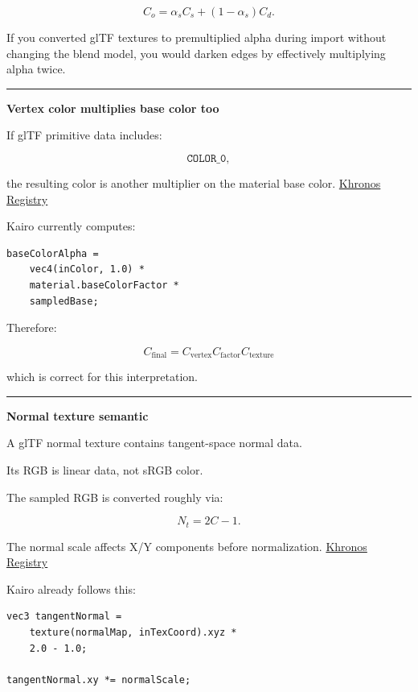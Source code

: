 \[
C_o
=
\alpha_sC_s+
(1-\alpha_s)C_d.
\]

If you converted glTF textures to premultiplied alpha during import without changing the blend model, you would darken edges by effectively multiplying alpha twice.

\begin{center}\rule{0.5\linewidth}{0.5pt}\end{center}

\textbf{Vertex color multiplies base color too}

If glTF primitive data includes:

\[
\texttt{COLOR_0},
\]

the resulting color is another multiplier on the material base color. \href{https://registry.khronos.org/glTF/specs/2.0/glTF-2.0.html?utm_source=chatgpt.com}{Khronos Registry}

Kairo currently computes:

\begin{verbatim}
baseColorAlpha =
    vec4(inColor, 1.0) *
    material.baseColorFactor *
    sampledBase;
\end{verbatim}

Therefore:

\[
\boxed{
C_{\text{final}}
=
C_{\text{vertex}}
C_{\text{factor}}
C_{\text{texture}}
}
\]

which is correct for this interpretation.

\begin{center}\rule{0.5\linewidth}{0.5pt}\end{center}

\textbf{Normal texture semantic}

A glTF normal texture contains tangent-space normal data.

Its RGB is linear data, not sRGB color.

The sampled RGB is converted roughly via:

\[
N_t=2C-1.
\]

The normal scale affects X/Y components before normalization. \href{https://registry.khronos.org/glTF/specs/2.0/glTF-2.0.pdf?utm_source=chatgpt.com}{Khronos Registry}

Kairo already follows this:

\begin{verbatim}
vec3 tangentNormal =
    texture(normalMap, inTexCoord).xyz *
    2.0 - 1.0;

tangentNormal.xy *= normalScale;
\end{verbatim}

